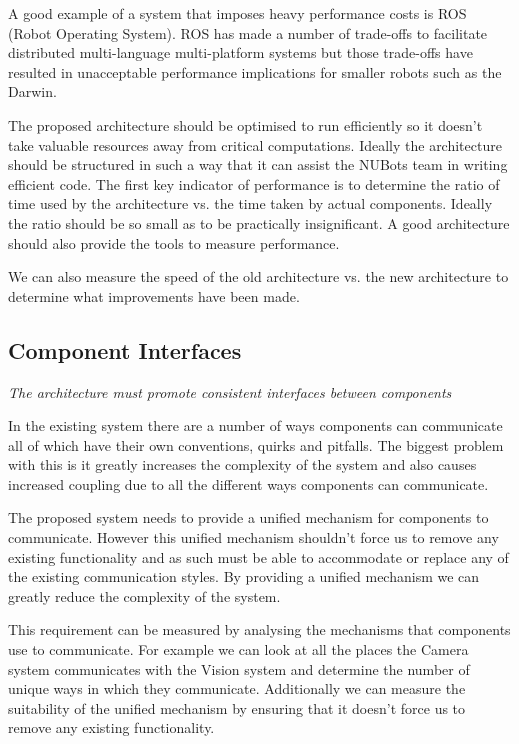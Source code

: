 \documentclass[english,12pt]{scrartcl}
\newcommand{\requirement}[1]{\textit{#1}}
\begin{document}
            A good example of a system that imposes heavy performance costs is ROS (Robot Operating
            System). ROS has made a number of trade-offs to facilitate distributed multi-language
            multi-platform systems but those trade-offs have resulted in unacceptable performance
            implications for smaller robots such as the Darwin.
            
            The proposed architecture should be optimised to run efficiently so it doesn't take
            valuable resources away from critical computations. Ideally the architecture should be
            structured in such a way that it can assist the NUBots team in writing efficient code.
            The first key indicator of performance is to determine the ratio of time used by the
            architecture vs. the time taken by actual components. Ideally the ratio should be so
            small as to be practically insignificant. A good architecture should also provide the
            tools to measure performance.
            
            We can also measure the speed of the old architecture vs. the new architecture to
            determine what improvements have been made. 
        
        \subsection{Component Interfaces}
            \requirement{The architecture must promote consistent interfaces between components}
            
            In the existing system there are a number of ways components can communicate all of
            which have their own conventions, quirks and pitfalls. The biggest problem with this is
            it greatly increases the complexity of the system and also causes increased coupling due
            to all the different ways components can communicate.
            
            The proposed system needs to provide a unified mechanism for components to communicate.
            However this unified mechanism shouldn't force us to remove any existing functionality
            and as such must be able to accommodate or replace any of the existing communication
            styles. By providing a unified mechanism we can greatly reduce the complexity of the
            system.
            
            This requirement can be measured by analysing the mechanisms that components use to
            communicate. For example we can look at all the places the Camera system communicates
            with the Vision system and determine the number of unique ways in which they
            communicate. Additionally we can measure the suitability of the unified mechanism by
            ensuring that it doesn't force us to remove any existing functionality.
        
\end{document}
